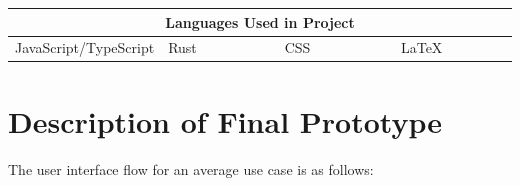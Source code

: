 
\begin{center}
\begin{longtable}{p{0.25\linewidth}p{0.25\linewidth}p{0.25\linewidth}p{0.25\linewidth}}
\toprule
\multicolumn{4}{c}{Languages Used in Project} \\
\midrule
JavaScript/TypeScript & Rust & CSS & \LaTeX \\
\bottomrule
\end{longtable}
\end{center}

\section{Description of Final
Prototype}











The user interface flow for an average use case is as follows: 

